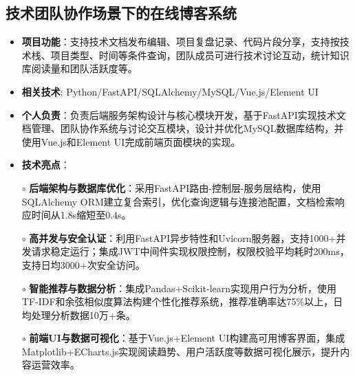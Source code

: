 \subsection{\textbf{技术团队协作场景下的在线博客系统} \hspace{2cm}{2024.07 -- 2024.09}}
  \begin{normalsize}
    \begin{itemize}
    \item \textbf{项目功能}：支持技术文档发布编辑、项目复盘记录、代码片段分享，支持按技术栈、项目类型、时间等条件查询，团队成员可进行技术讨论互动，统计知识库阅读量和团队活跃度等。
    \item \textbf{相关技术}: Python/FastAPI/SQLAlchemy/MySQL/Vue.js/Element UI
    \item \textbf{个人负责}：负责后端服务架构设计与核心模块开发，基于FastAPI实现技术文档管理、团队协作系统与讨论交互模块，设计并优化MySQL数据库结构，并使用Vue.js和Element UI完成前端页面模块的实现。
    \item \textbf{技术亮点}：
    \setlength{\itemindent}{1em} %
      \item[$\circ$] \textbf{后端架构与数据库优化}：采用FastAPI路由-控制层-服务层结构，使用SQLAlchemy ORM建立复合索引，优化查询逻辑与连接池配置，文档检索响应时间从1.8s缩短至0.4s。
      \item[$\circ$] \textbf{高并发与安全认证}：利用FastAPI异步特性和Uvicorn服务器，支持1000+并发请求稳定运行；集成JWT中间件实现权限控制，权限校验平均耗时200ms，支持日均3000+次安全访问。
      \item[$\circ$] \textbf{智能推荐与数据分析}：集成Pandas+Scikit-learn实现用户行为分析，使用TF-IDF和余弦相似度算法构建个性化推荐系统，推荐准确率达75\%以上，日均处理分析数据10万+条。
      \item[$\circ$] \textbf{前端UI与数据可视化}：基于Vue.js+Element UI构建高可用博客界面，集成Matplotlib+ECharts.js实现阅读趋势、用户活跃度等数据可视化展示，提升内容运营效率。
    \end{itemize}
  \end{normalsize}
